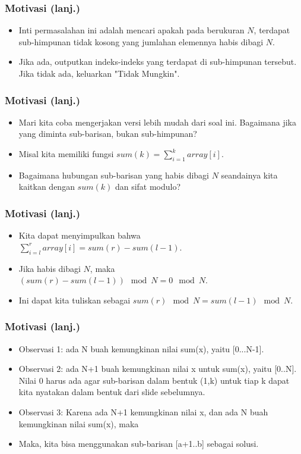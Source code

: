 \begin{frame}
\frametitle{Motivasi (lanj.)}
\begin{itemize}
  \item Inti permasalahan ini adalah mencari apakah pada  berukuran $N$, terdapat sub-himpunan tidak kosong yang jumlahan elemennya habis dibagi $N$.
  \item Jika ada, outputkan indeks-indeks yang terdapat di sub-himpunan tersebut. Jika tidak ada, keluarkan "Tidak Mungkin".
\end{itemize}
\end{frame}

\begin{frame}
\frametitle{Motivasi (lanj.)}
\begin{itemize}
  \item Mari kita coba mengerjakan versi lebih mudah dari soal ini. Bagaimana jika yang diminta sub-barisan, bukan sub-himpunan?
  \item Misal kita memiliki fungsi $sum(k) = \sum\limits_{i=1}^k array[i]$.
  \item Bagaimana hubungan sub-barisan yang habis dibagi $N$ seandainya kita kaitkan dengan $sum(k)$ dan sifat modulo?
\end{itemize}
\end{frame}

\begin{frame}
\frametitle{Motivasi (lanj.)}
\begin{itemize}
  \item Kita dapat menyimpulkan bahwa $\sum\limits_{i=l}^r array[i] = sum(r) - sum(l - 1)$.
  \item Jika habis dibagi $N$, maka $(sum(r) - sum(l - 1)) \mod N = 0 \mod N$.
  \item Ini dapat kita tuliskan sebagai $sum(r) \mod N = sum(l - 1) \mod N$.
\end{itemize}
\end{frame}

\begin{frame}
\frametitle{Motivasi (lanj.)}
\begin{itemize}
  \item Observasi 1: ada N buah kemungkinan nilai sum(x), yaitu [0...N-1].
  \item Observasi 2: ada N+1 buah kemungkinan nilai x untuk sum(x), yaitu [0..N]. Nilai 0 harus ada agar sub-barisan dalam bentuk (1,k) untuk tiap k dapat kita nyatakan dalam bentuk dari slide sebelumnya.
  \item Observasi 3: Karena ada N+1 kemungkinan nilai x, dan ada N buah kemungkinan nilai sum(x), maka 
  \item Maka, kita bisa menggunakan sub-barisan [a+1..b] sebagai solusi.
\end{itemize}
\end{frame}

